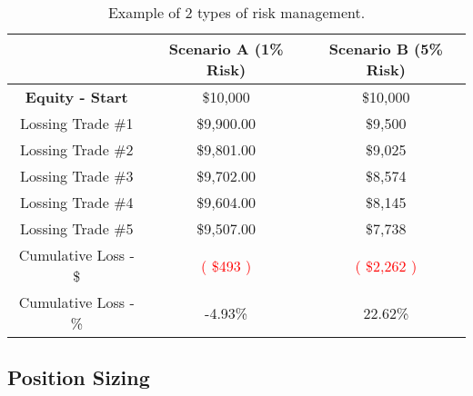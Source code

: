 \documentclass[10pt]{article}
\begin{document}
\renewcommand{\arraystretch}{1.5} %
\setlength{\tabcolsep}{10pt} %

\begin{table}[h]
\centering
\begin{tabular}{|c|c|c|}
\cline{2-3}
  \multicolumn{1}{c|}{} & \textbf{Scenario A (1\% Risk)} & \textbf{Scenario B (5\% Risk)} \\
\hline
\textbf{Equity - Start} & \$10,000 & \$10,000 \\
\hline
Lossing Trade \#1 & \$9,900.00 & \$9,500 \\
\hline                     
Lossing Trade \#2 & \$9,801.00 & \$9,025 \\
\hline                     
Lossing Trade \#3 & \$9,702.00 & \$8,574 \\
\hline                     
Lossing Trade \#4 & \$9,604.00 & \$8,145 \\
\hline                     
Lossing Trade \#5 & \$9,507.00 & \$7,738 \\
\hline
  Cumulative Loss - \$ & \textcolor{red}{( \$493 )} & \textcolor{red}{( \$2,262 )} \\
\hline
Cumulative Loss - \% & -4.93\% & 22.62\% \\
\hline
\end{tabular}
\caption{Example of 2 types of risk management.}
\end{table}

\subsection*{Position Sizing}
\newpage


\end{document}
